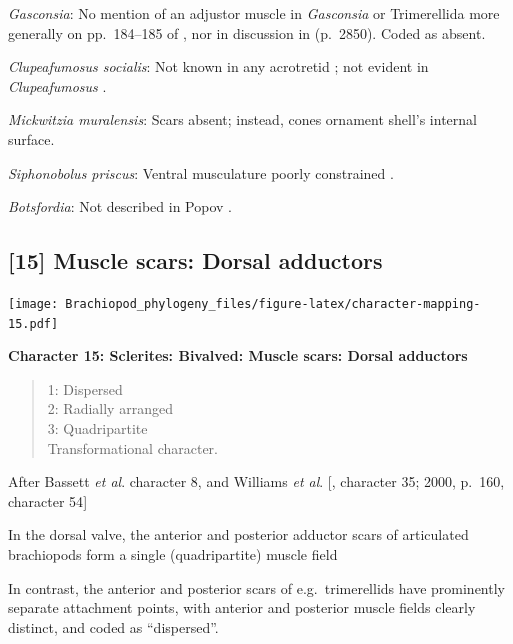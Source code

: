 \documentclass[]{book}
\theoremstyle{definition}
\theoremstyle{definition}
\theoremstyle{definition}
\theoremstyle{remark}
\begin{document}
\emph{Gasconsia}: No mention of an adjustor muscle in \emph{Gasconsia}
or Trimerellida more generally on pp.~184--185 of
\citet{Williams2000BrachiopodaLinguliformea}, nor in discussion in
\citet{Williams2007PartH} (p.~2850). Coded as absent.

\emph{Clupeafumosus socialis}: Not known in any acrotretid
\citep{Williams2000BrachiopodaLinguliformea}; not evident in
\emph{Clupeafumosus} \citep{Topper2013Reappraisalof}.

\emph{Mickwitzia muralensis}: Scars absent; instead, cones ornament
shell's internal surface.

\emph{Siphonobolus priscus}: Ventral musculature poorly constrained
\citep{Williams2000BrachiopodaLinguliformea, Popov2009Earlyontogeny}.

\emph{Botsfordia}: Not described in Popov
\citeyearpar{Popov1992TheCambrian}.

\hypertarget{muscle-scars-dorsal-adductors}{%
\subsection*{{[}15{]} Muscle scars: Dorsal
adductors}\label{muscle-scars-dorsal-adductors}}

\texttt{[image: Brachiopod\_phylogeny\_files/figure-latex/character-mapping-15.pdf]}

\textbf{Character 15: Sclerites: Bivalved: Muscle scars: Dorsal
adductors}

\begin{quote}
1: Dispersed\\
2: Radially arranged\\
3: Quadripartite\\
Transformational character.
\end{quote}

After Bassett \emph{et al}.
\citeyearpar{Bassett2001Functionalmorphology} character 8, and Williams
\emph{et al}. {[}\citeyearpar{Williams1996Asupra}, character 35; 2000,
p.~160, character 54{]}

In the dorsal valve, the anterior and posterior adductor scars of
articulated brachiopods form a single (quadripartite) muscle field
\citep[p.~201]{Williams2000BrachiopodaLinguliformea}

In contrast, the anterior and posterior scars of e.g.~trimerellids have
prominently separate attachment points, with anterior and posterior
muscle fields clearly distinct, and coded as ``dispersed''.
\end{document}
